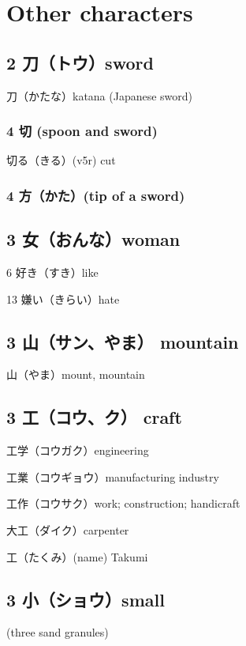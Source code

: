 \chapter{Other characters}

\section{2 刀（トウ）sword}

刀（かたな）katana (Japanese sword)

\subsection{4 切 (spoon and sword)}

切る（きる）(v5r) cut

\subsection{4 方（かた）(tip of a sword)}

\section{3 女（おんな）woman}

6 好き（すき）like

13 嫌い（きらい）hate

\section{3 山（サン、やま） mountain}

山（やま）mount, mountain

\section{3 工（コウ、ク） craft}

工学（コウガク）engineering

工業（コウギョウ）manufacturing industry

工作（コウサク）work; construction; handicraft

大工（ダイク）carpenter

工（たくみ）(name) Takumi

\section{3 小（ショウ）small}

(three sand granules)


